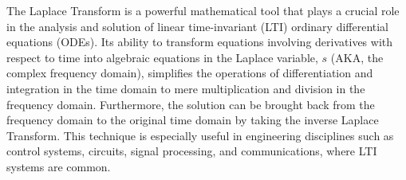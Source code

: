 The Laplace Transform is a powerful mathematical tool that plays a crucial role in the analysis and solution of linear time-invariant (LTI) ordinary differential equations (ODEs). Its ability to transform equations involving derivatives with respect to time into algebraic equations in the Laplace variable, $s$ (AKA, the complex frequency domain), simplifies the operations of differentiation and integration in the time domain to mere multiplication and division in the frequency domain. Furthermore, the solution can be brought back from the frequency domain to the original time domain by taking the inverse Laplace Transform. This technique is especially useful in engineering disciplines such as control systems, circuits, signal processing, and communications, where LTI systems are common. 

\vspace*{.2cm}

